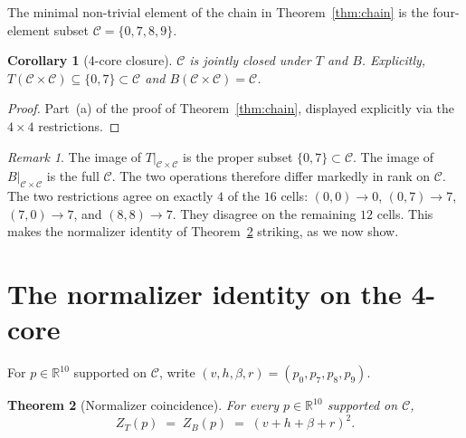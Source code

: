 \documentclass[11pt,reqno]{amsart}
\theoremstyle{plain}
\newtheorem{theorem}{Theorem}
\newtheorem{corollary}[theorem]{Corollary}
\theoremstyle{definition}
\theoremstyle{remark}
\newtheorem*{remark}{Remark}
\newcommand{\R}{\mathbb{R}}
\newcommand{\Cfour}{\mathcal{C}}
\begin{document}
The minimal non-trivial element of the chain in
Theorem~\ref{thm:chain} is the four-element subset
$\Cfour=\{0,7,8,9\}$.

\begin{corollary}[4-core closure]\label{cor:4core}
$\Cfour$ is jointly closed under $T$ and $B$. Explicitly,
$T(\Cfour\times\Cfour)\subseteq\{0,7\}\subset\Cfour$ and
$B(\Cfour\times\Cfour)=\Cfour$.
\end{corollary}

\begin{proof}
Part~(a) of the proof of Theorem~\ref{thm:chain}, displayed
explicitly via the $4\times 4$ restrictions.
\end{proof}

\begin{remark}\label{rem:rank-disparity}
The image of $T\big|_{\Cfour\times\Cfour}$ is the proper subset
$\{0,7\}\subset\Cfour$. The image of $B\big|_{\Cfour\times\Cfour}$
is the full $\Cfour$. The two operations therefore differ
markedly in rank on $\Cfour$. The two restrictions agree on
exactly $4$ of the $16$ cells: $(0,0)\to 0$, $(0,7)\to 7$,
$(7,0)\to 7$, and $(8,8)\to 7$. They disagree on the remaining
$12$ cells. This makes the normalizer identity of
Theorem~\ref{thm:norm} striking, as we now show.
\end{remark}

\section{The normalizer identity on the 4-core}\label{sec:norm}

For $p\in\R^{10}$ supported on $\Cfour$, write
$(v,h,\beta,r)=(p_{0},p_{7},p_{8},p_{9})$.

\begin{theorem}[Normalizer coincidence]\label{thm:norm}
For every $p\in\R^{10}$ supported on $\Cfour$,
\[
Z_{T}(p)\;=\;Z_{B}(p)\;=\;(v+h+\beta+r)^{2}.
\]
\end{theorem}
\end{document}
